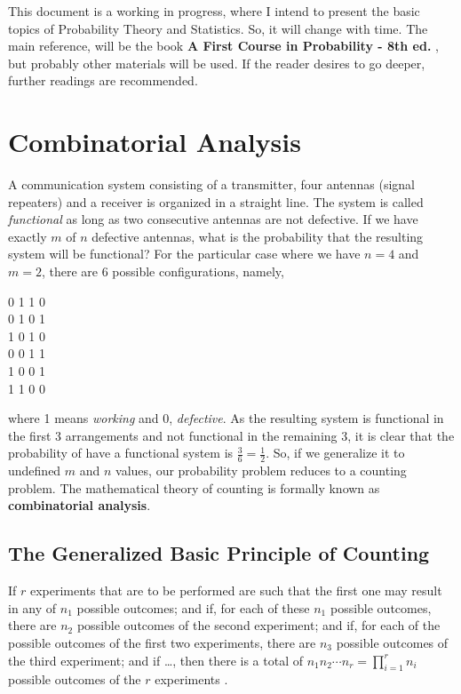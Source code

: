 \documentclass[a4paper,twocolumn]{article}
\begin{document}
This document is a working in progress, where I intend to present the basic topics of Probability Theory and Statistics. So, it will change with time. The main reference, will be the book \textbf{A First Course in Probability - 8th ed.} \cite{ross}, but probably other materials will be used. If the reader desires to go deeper, further readings are recommended.


\section{Combinatorial Analysis}

A communication system consisting of a transmitter, four antennas (signal repeaters) and a receiver is organized in a straight line. The system is called \textit{functional} as long as two consecutive antennas are not defective. If we have exactly $m$ of $n$ defective antennas, what is the probability that the resulting system will be functional? For the particular case where we have $n = 4$ and $m = 2$, there are 6 possible configurations, namely,

\begin{center}
0 1 1 0\\
0 1 0 1\\
1 0 1 0\\
0 0 1 1\\
1 0 0 1\\
1 1 0 0
\end{center}

\noindent where 1 means \textit{working} and 0, \textit{defective}. As the resulting system is functional in the first 3 arrangements and not functional in the remaining 3, it is clear that the probability of have a functional system is $\frac{3}{6} = \frac{1}{2}$. So, if we generalize it to undefined $m$ and $n$ values, our probability problem reduces to a counting problem. The mathematical theory of counting is formally known as \textbf{combinatorial analysis}.


\subsection{The Generalized Basic Principle of Counting}

If $r$ experiments that are to be performed are such that the first one may result in any of $n_1$ possible outcomes; and if, for each of these $n_1$ possible outcomes, there are $n_2$ possible outcomes of the second experiment; and if, for each of the possible outcomes of the first two experiments, there are $n_3$ possible outcomes of the third experiment; and if \dots , then there is a total of $n_1 n_2 \dotsm n_r = \prod_{i=1}^{r} n_i$ possible outcomes of the $r$ experiments \cite{ross}.\\
\end{document}
